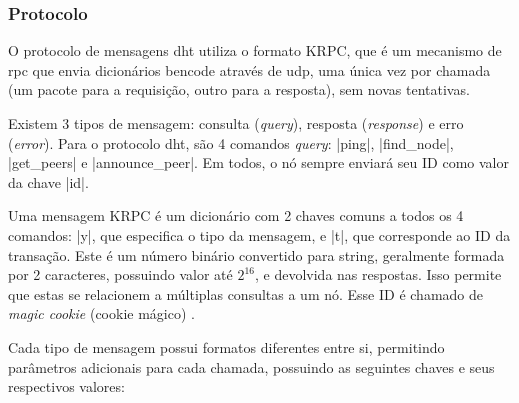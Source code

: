 
\subsubsection*{Protocolo}

O protocolo de mensagens \gls*{dht} utiliza o formato KRPC, que é um mecanismo de
\gls{rpc} que envia dicionários \gls*{bencode} através de \gls*{udp}, uma única
vez por chamada (um pacote para a requisição, outro para a resposta), sem novas
tentativas.

Existem 3 tipos de mensagem: consulta (\emph{query}), resposta (\emph{response}) e erro
(\emph{error}). Para o protocolo \gls*{dht}, são 4 comandos \emph{query}: \bverb|ping|,
\bverb|find_node|, \bverb|get_peers| e \bverb|announce_peer|. Em todos, o nó sempre
enviará seu ID como valor da chave \bverb|id|.

Uma mensagem KRPC é um dicionário com 2 chaves comuns a todos os 4 comandos: \bverb|y|,
que especifica o tipo da mensagem, e \bverb|t|, que corresponde ao ID da transação.
Este é um número binário convertido para \gls*{string}, geralmente formada por 2
caracteres, possuindo valor até $2^{16}$, e devolvida nas respostas. Isso permite que
estas se relacionem a múltiplas consultas a um nó. Esse ID é chamado de \emph{magic
cookie} (cookie mágico) \cite{wiki:magic-cookie}.

Cada tipo de mensagem possui formatos diferentes entre si, permitindo parâmetros
adicionais para cada chamada, possuindo as seguintes chaves e seus respectivos valores:

